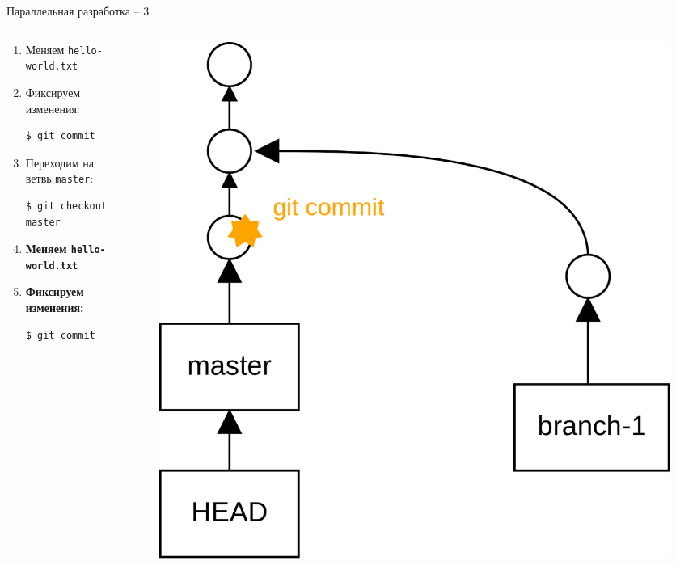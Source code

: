 \documentclass[presentation]{beamer}
\begin{document}
\begin{frame}[fragile]{Параллельная разработка -- 3}
  \begin{columns}
    \begin{column}{.5\textwidth}
      \begin{enumerate}
      \item Меняем \texttt{hello-world.txt}
      \item Фиксируем изменения:
\begin{verbatim}
$ git commit
\end{verbatim}
      \item Переходим на ветвь \texttt{master}:
\begin{verbatim}
$ git checkout master
\end{verbatim}
      \item \textbf{Меняем \texttt{hello-world.txt}}
      \item \textbf{Фиксируем изменения:}
\begin{verbatim}
$ git commit
\end{verbatim}
      \end{enumerate}
      \end{column}
      \begin{column}{.5\textwidth}
        \begin{figure}[htb]
          \centering
          \includegraphics[height=.7\textheight]{git-operation-branch-4}
        \end{figure}
      \end{column}
    \end{columns}
\end{frame}
\end{document}
